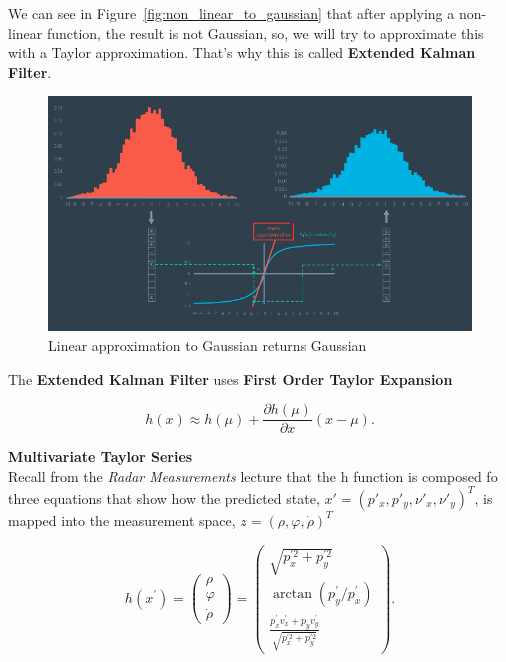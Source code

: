 \documentclass[11pt, a4paper]{article}
\begin{document}
We can see in Figure~\ref{fig:non_linear_to_gaussian} that after applying a non-linear function, the result is not Gaussian, so, we will try to approximate this with a Taylor approximation. That's why this is called \textbf{Extended Kalman Filter}. 




\begin{figure}[htpb!]
	\centering
	\includegraphics[width=0.8\linewidth]{linear_approx}
	\caption{Linear approximation to Gaussian returns Gaussian}
	\label{fig:linaer_approx}
\end{figure}

The \textbf{Extended Kalman Filter} uses \textbf{First Order Taylor Expansion}

\[
	h(x) \approx h(\mu) + \frac{\partial h(\mu)}{\partial x} (x - \mu)
.\] 




\textbf{Multivariate Taylor Series} \\

Recall from the \textit{Radar Measurements} lecture that the h function is composed fo three equations that show how the predicted state, $x' = (p'_x, p'_y, \nu'_x, \nu'_y)^T$, is mapped into the measurement space, $z = (\rho, \varphi, \dot{\rho})^T$



\[
	h\left(x^{\prime}\right)=\left(\begin{array}{c}{\rho} \\ {\varphi} \\ {\dot{\rho}}\end{array}\right)= \left(\begin{array}{c}{\sqrt{p_{x}^{\prime 2}+p^{\prime2}_{y}}} \\ 
	{\operatorname{arctan}\left(p_{y}^{\prime} / p_{x}^{\prime}\right)} \\ 
{\frac{p_{x}^{\prime} v_{x}^{\prime}+p_{y} v_{y}^{\prime}}{\sqrt{p_{x}^{\prime2}+p_{y}^{\prime2}}}}\end{array}\right)
.\] 
\end{document}
